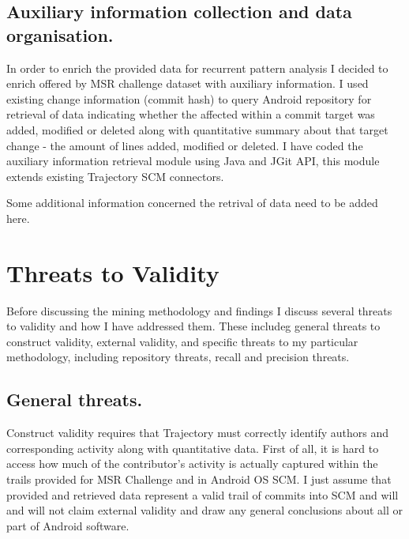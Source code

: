 \documentclass[a4paper,10pt]{article}
\numberwithin{equation}{subsection}
\begin{document}
\subsection{Auxiliary information collection and data organisation.}
In order to enrich the provided data for recurrent pattern analysis I decided to enrich offered by MSR
challenge dataset with auxiliary information. I used existing change information (commit hash) to 
query Android repository for retrieval of data indicating whether the affected within a commit target 
was added, modified or deleted along with quantitative summary about that target change - the amount of 
lines added, modified or deleted. I have coded the auxiliary information retrieval module using Java and
JGit API, this module extends existing Trajectory SCM connectors.

Some additional information concerned the retrival of data need to be added here.

\section{Threats to Validity}
Before discussing the mining methodology and findings I discuss several threats to validity and how 
I have addressed them. These includeg general threats to construct validity, external validity,
and specific threats to my particular methodology, including repository threats, recall and 
precision threats.

\subsection{General threats.}
Construct validity requires that Trajectory must correctly identify authors and corresponding activity
along with quantitative data. First of all, it is hard to access how much of the contributor's activity 
is actually captured within the trails provided for MSR Challenge and in Android OS SCM. I just assume 
that provided and retrieved data represent a valid trail of commits into SCM and will and will not 
claim external validity and draw any general conclusions about all or part of Android software. 
\end{document}
